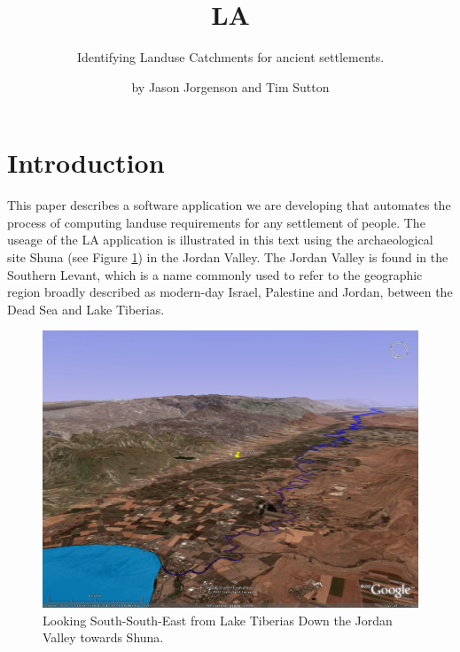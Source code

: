 

\title{LA} \subtitle{Identifying Landuse Catchments for 
ancient settlements.}

\author{by Jason Jorgenson and Tim Sutton}

\maketitle

\section{Introduction} \label{sec:Introduction}

This paper describes a software application we are developing that automates
the process of computing landuse requirements for any settlement of people.
The useage of the LA application is illustrated in this text using the  
archaeological site Shuna (see Figure \ref{fig:shunaGoogleEarth}) in the Jordan
Valley.  The Jordan Valley is found in the Southern Levant, which is a name
commonly used to refer to the geographic region broadly described as modern-day
Israel, Palestine and Jordan, between the Dead Sea and Lake Tiberias.

\begin{figure}[htbp] %
\includegraphics[scale=0.17]{./images/ShunaGoogleEarth3D.jpg}
 \caption{\label{fig:shunaGoogleEarth}Looking South-South-East from Lake
Tiberias Down the Jordan Valley towards Shuna.} 
\end{figure}

